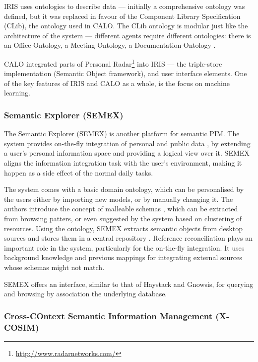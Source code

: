 IRIS uses ontologies to describe data --- initially a comprehensive ontology was defined, but it was replaced in favour of the Component Library Specification (CLib), the ontology used in CALO. The CLib ontology is modular just like the architecture of the system --- different agents require different ontologies: there is an Office Ontology, a Meeting Ontology, a Documentation Ontology \cite{Ambite2005}.

CALO integrated parts of Personal Radar\footnote{\url{http://www.radarnetworks.com/}} into IRIS --- the triple-store implementation (Semantic Object framework), and user interface elements. One of the key features of IRIS and CALO as a whole, is the focus on machine learning. 

\subsubsection{Semantic Explorer (SEMEX)}

The Semantic Explorer (SEMEX) is another platform for semantic PIM. The system provides on-the-fly integration of personal and public data \cite{Dong2004}, by extending a user's personal information space and providing a logical view over it. SEMEX aligns the information integration task with the user's environment, making it happen as a side effect of the normal daily tasks.

The system comes with a basic domain ontology, which can be personalised by the users either by importing new models, or by manually changing it. The authors introduce the concept of malleable schemas \cite{Dong2005c}, which can be extracted from browsing patters, or even suggested by the system based on clustering of resources. Using the ontology, SEMEX extracts semantic objects from desktop sources and stores them in a central repository \cite{Dong2005a}. 
Reference reconciliation \cite{Dong2004,Dong2005b} plays an important role in the system, particularly for the on-the-fly integration. It uses background knowledge and previous mappings for integrating external sources whose schemas might not match. 

SEMEX offers an interface, similar to that of Haystack and Gnowsis, for querying and browsing by association the underlying database.

\subsubsection{Cross-COntext Semantic Information Management (X-COSIM)}

